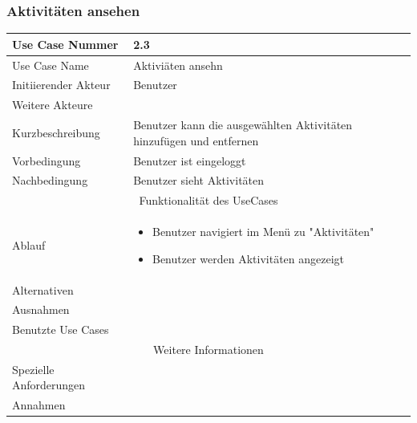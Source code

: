 \documentclass[10pt,a4paper]{article}
\begin{document}
\subsubsection{Aktivit\"aten ansehen}
		\begin{tabular}{|l|p{.5\linewidth}|}
		\hline Use Case Nummer & 2.3 \\ 
		\hline Use Case Name & Aktivi\"aten ansehn \\ 
		\hline Initiierender Akteur & Benutzer \\
		\hline Weitere Akteure &  \\
		\hline Kurzbeschreibung & Benutzer kann die ausgew\"ahlten Aktivit\"aten hinzuf\"ugen und entfernen \\
		\hline Vorbedingung & Benutzer ist eingeloggt \\
		\hline Nachbedingung & Benutzer sieht Aktivit\"aten \\
		\hline \multicolumn{2}{|c|}{Funktionalität des UseCases}\\
		\hline Ablauf & \begin{itemize}
			\item Benutzer navigiert im Menü zu "Aktivit\"aten"
			\item Benutzer werden Aktivit\"aten angezeigt
		\end{itemize} \\
		\hline Alternativen &  \\
		\hline Ausnahmen &  \\
		\hline Benutzte Use Cases &  \\
		\hline \multicolumn{2}{|c|}{Weitere Informationen} \\
		\hline Spezielle Anforderungen &  \\
		\hline Annahmen &  \\
		\hline
		\end{tabular}
\end{document}
